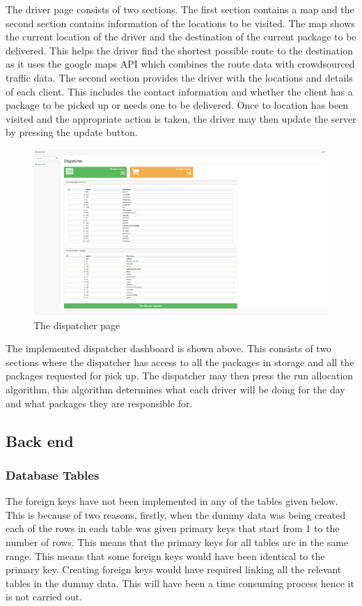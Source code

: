 \documentclass[paper=a4, fontsize=11pt]{scrartcl} %
\numberwithin{equation}{section} %
\numberwithin{figure}{section} %
\numberwithin{table}{section} %
\begin{document}
The driver page consists of two sections. The first section contains a map and the second section contains information of the locations to be visited. The map shows the current location of the driver and the destination of the current package to be delivered. This helps the driver find the shortest possible route to the destination as it uses the google maps API which combines the route data with crowdsourced traffic data. The second section provides the driver with the locations and details of each client. This includes the contact information and whether the client has a package to be picked up or needs one to be delivered. Once to location has been visited and the appropriate action is taken, the driver may then update the server by pressing the update button.


\begin{figure}[hbt!]
\centering
\includegraphics[width=4.5in]{pictures/dispatcher_page.png}
\caption{The dispatcher page}
\label{DispatcherPage}
\end{figure}

The implemented dispatcher dashboard is shown above. This consists of two sections where the dispatcher has access to all the packages in storage and all the packages requested for pick up. The dispatcher may then press the run allocation algorithm, this algorithm determines what each driver will be doing for the day and what packages they are responsible for.

\subsection{Back end}

\subsubsection{Database Tables}
The foreign keys have not been implemented in any of the tables given below. This is because of two reasons, firstly, when the dummy data was being created each of the rows in each table was given primary keys that start from 1 to the number of rows. This means that the primary keys for all tables are in the same range. This means that some foreign keys would have been identical to the primary key. Creating foreign keys would have required linking all the relevant tables in the dummy data. This will have been a time consuming process hence it is not carried out. 
\end{document}
